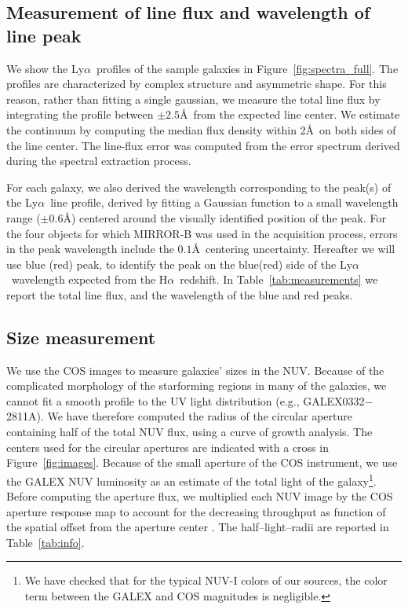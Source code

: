 \documentclass[manuscript]{emulateapj}
\newcommand{\lya}{Ly$\alpha$}
\newcommand{\ha}{H$\alpha$}
\begin{document}
\subsection{Measurement of line flux and wavelength of line peak}\label{sect:peakmeas}
We show the \lya\ profiles of the sample galaxies in
Figure~\ref{fig:spectra_full}.  The profiles are characterized by
complex structure and asymmetric shape.  For this reason, rather than
fitting a single gaussian, we measure the total line flux by
integrating the profile between $\pm 2.5$\AA\ from the expected line
center. We estimate the continuum by computing the median flux density
within 2\AA\ on both sides of the line center. The line-flux error was
computed from the error spectrum derived during the spectral
extraction process.  

For each galaxy, we also derived the wavelength corresponding to the
peak(s) of the \lya\ line profile, derived by fitting a Gaussian
function to a small wavelength range ($\pm 0.6$\AA) centered around
the visually identified position of the peak. For the four objects for
which MIRROR-B was used in the acquisition process, errors in the peak
wavelength include the $0.1$\AA\ centering uncertainty.  Hereafter we
will use blue (red) peak, to identify the peak on the blue(red) side
of the \lya\ wavelength expected from the \ha\ redshift. In
Table~\ref{tab:measurements} we report the total line flux, and the
wavelength of the blue and red peaks.

\subsection{Size measurement}
We use the COS images to measure galaxies' sizes in the NUV.  Because
of the complicated morphology of the starforming regions in many of
the galaxies, we cannot fit a smooth profile to the UV light
distribution (e.g., GALEX0332$-$2811A). We have therefore computed the
radius of the circular aperture containing half of the total NUV flux,
using a curve of growth analysis. The centers used for the circular
apertures are indicated with a cross in Figure~\ref{fig:images}.
Because of the small aperture of the COS instrument, we use the GALEX
NUV luminosity as an estimate of the total light of the
galaxy\footnote{We have checked that for the typical NUV-I colors of
  our sources, the color term between the GALEX and COS magnitudes is
  negligible.}. Before computing the aperture flux, we multiplied each
NUV image by the COS aperture response map to account for the
decreasing throughput as function of the spatial offset from the
aperture center \citep{Goudfrooij2010}. The half--light--radii are
reported in Table~\ref{tab:info}.
\end{document}

